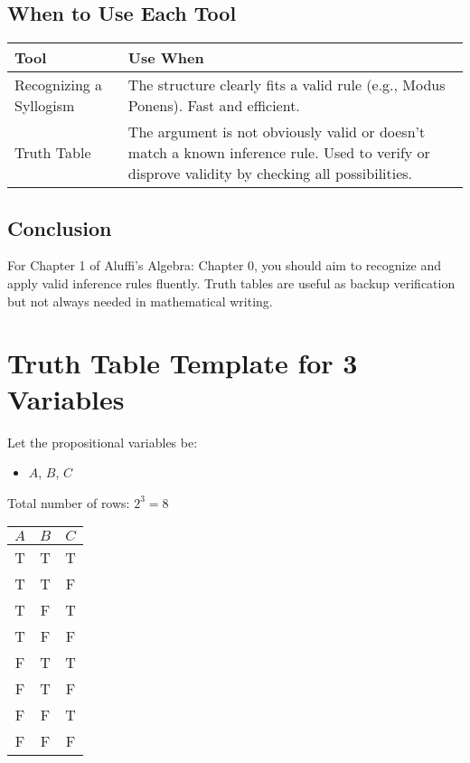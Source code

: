 \documentclass[10pt]{article}
\theoremstyle{plain}
\theoremstyle{definition}
\begin{document}
  \subsection*{When to Use Each Tool}
  
  \begin{tabular}{|l|p{10cm}|}
  	\hline
  	\textbf{Tool} & \textbf{Use When} \\
  	\hline
  	Recognizing a Syllogism & The structure clearly fits a valid rule (e.g., Modus Ponens). Fast and efficient. \\
  	\hline
  	Truth Table & The argument is not obviously valid or doesn't match a known inference rule. Used to verify or disprove validity by checking all possibilities. \\
  	\hline
  \end{tabular}
  
  \subsection*{Conclusion}
  
  For Chapter 1 of Aluffi’s Algebra: Chapter 0, you should aim to recognize and apply valid inference rules fluently. Truth tables are useful as backup verification but not always needed in mathematical writing.
  
  \section*{Truth Table Template for 3 Variables}
  
  Let the propositional variables be:
  \begin{itemize}
  	\item $A$, $B$, $C$
  \end{itemize}
  
  Total number of rows: $2^3 = 8$
  
  \begin{center}
  	\begin{tabular}{|c|c|c|}
  		\hline
  		$A$ & $B$ & $C$ \\
  		\hline
  		T & T & T \\
  		T & T & F \\
  		T & F & T \\
  		T & F & F \\
  		F & T & T \\
  		F & T & F \\
  		F & F & T \\
  		F & F & F \\
  		\hline
  	\end{tabular}
  \end{center}
  
\end{document}
